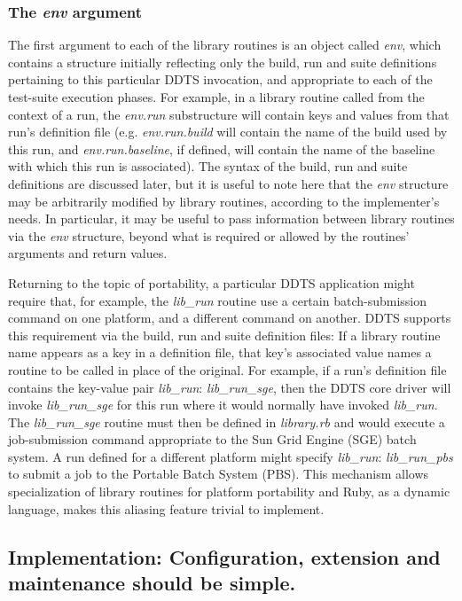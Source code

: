 \documentclass[conference]{IEEEtran}
\begin{document}
\subsubsection{The \emph{env} argument}
The first argument to each of the library routines is an object called \emph{env}, which contains a structure initially reflecting only the build, run and suite definitions pertaining to this particular DDTS invocation, and appropriate to each of the test-suite execution phases. For example, in a library routine called from the context of a run, the \emph{env.run} substructure will contain keys and values from that run's definition file (e.g. \emph{env.run.build} will contain the name of the build used by this run, and \emph{env.run.baseline}, if defined, will contain the name of the baseline with which this run is associated). The syntax of the build, run and suite definitions are discussed later, but it is useful to note here that the \emph{env} structure may be arbitrarily modified by library routines, according to the implementer's needs. In particular, it may be useful to pass information between library routines via the \emph{env} structure, beyond what is required or allowed by the routines' arguments and return values.

Returning to the topic of portability, a particular DDTS application might require that, for example, the \emph{lib\_run} routine use a certain batch-submission command on one platform, and a different command on another. DDTS supports this requirement via the build, run and suite definition files: If a library routine name appears as a key in a definition file, that key's associated value names a routine to be called in place of the original. For example, if a run's definition file contains the key-value pair \emph{lib\_run}: \emph{lib\_run\_sge}, then the DDTS core driver will invoke \emph{lib\_run\_sge} for this run where it would normally have invoked \emph{lib\_run}. The \emph{lib\_run\_sge} routine must then be defined in \emph{library.rb} and would execute a job-submission command appropriate to the Sun Grid Engine (SGE) batch system. A run defined for a different platform might specify \emph{lib\_run}: \emph{lib\_run\_pbs} to submit a job to the Portable Batch System (PBS). This mechanism allows specialization of library routines for platform portability and Ruby, as a dynamic language, makes this aliasing feature trivial to implement.

\subsection{Implementation: Configuration, extension and maintenance should be simple.}
\end{document}
